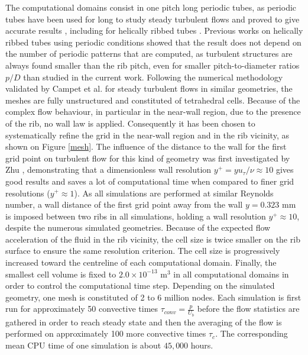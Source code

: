 The computational domains consist in one pitch long periodic tubes, as periodic tubes have been used for long to study steady turbulent flows and proved to give accurate results \cite{rogallo1984,kim1987,JimenezMoin1991}, including for helically ribbed tubes \cite{campet2018}. Previous works on helically ribbed tubes using periodic conditions \cite{Zhu2015,campet2018} showed that the result does not depend on the number of periodic patterns that are computed, as turbulent structures are always found smaller than the rib pitch, even for smaller pitch-to-diameter ratios $p/D$ than studied in the current work. Following the numerical methodology validated by Campet et al. \cite{campet2018} for steady turbulent flows in similar geometries, the meshes are fully unstructured and constituted of tetrahedral cells. Because of the complex flow behaviour, in particular in the near-wall region, due to the presence of the rib, no wall law is applied. Consequently it has been chosen to systematically refine the grid in the near-wall region and in the rib vicinity, as shown on Figure \ref{mesh}. The influence of the distance to the wall for the first grid point on turbulent flow for this kind of geometry was first investigated by Zhu \cite{Zhu2015}, demonstrating that a dimensionless wall resolution $y^+ = y u_{\tau} / \nu \approx 10$ gives good results and saves a lot of computational time when compared to finer grid resolutions ($y^+ \approx 1$). As all simulations are performed at similar Reynolds number, a wall distance of the first grid point away from the wall $y = 0.323$ mm is imposed between two ribs in all simulations, holding a wall resolution $y^+ \approx 10$, despite the numerous simulated geometries. Because of the expected flow acceleration of the fluid in the rib vicinity, the cell size is twice smaller on the rib surface to ensure the same resolution criterion. The cell size is progressively increased toward the centreline of each computational domain. Finally, the smallest cell volume is fixed to $2.0 \times 10^{-13}$ m$^3$ in all computational domains in order to control the computational time step. Depending on the simulated geometry, one mesh is constituted of 2 to 6 million nodes. Each simulation is first run for approximately 50 convective times $\tau_{conv} = \frac{p}{U_b}$ before the flow statistics are gathered in order to reach steady state and then the averaging of the flow is performed on approximately 100 more convective times $\tau_c$. The corresponding mean CPU time of one simulation is about $45,000$ hours.\\  

